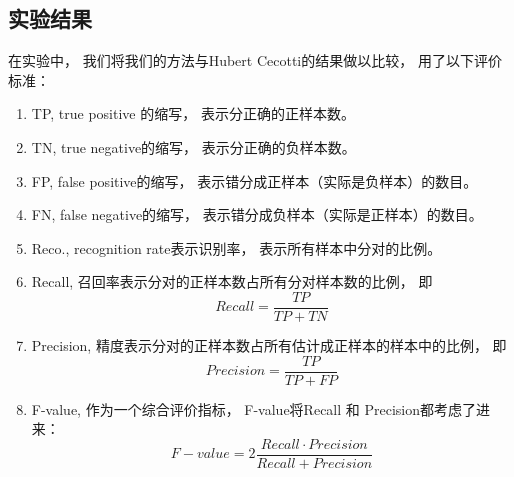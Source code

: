 \subsection{实验结果}
在实验中， 我们将我们的方法与Hubert Cecotti的结果做以比较， 用了以下评价标准：
\begin{enumerate}
	\item TP,
	true positive 的缩写， 表示分正确的正样本数。

	\item TN,
	true negative的缩写， 表示分正确的负样本数。

	\item FP,
	false positive的缩写， 表示错分成正样本（实际是负样本）的数目。

	\item FN,
	false negative的缩写， 表示错分成负样本（实际是正样本）的数目。

	\item Reco.,
	recognition rate表示识别率， 表示所有样本中分对的比例。

	\item Recall,
	召回率表示分对的正样本数占所有分对样本数的比例， 即
	\begin{equation}
		Recall = \frac{TP}{TP+TN}
	\end{equation}

	\item Precision,
	精度表示分对的正样本数占所有估计成正样本的样本中的比例， 即
	\begin{equation}
		Precision = \frac{TP}{TP+FP}
	\end{equation}

	\item F-value,
	作为一个综合评价指标， F-value将Recall 和 Precision都考虑了进来：
	\begin{equation}
		F-value = 2\frac{Recall \cdot Precision}{Recall+Precision}
	\end{equation}
\end{enumerate}


